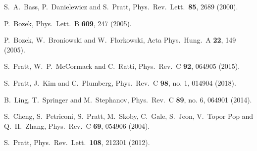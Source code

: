 \begin{thebibliography}{99}
  S.~A.~Bass, P.~Danielewicz and S.~Pratt,
  Phys.\ Rev.\ Lett.\  {\bf 85}, 2689 (2000).
	

  P.~Bozek,
  Phys.\ Lett.\ B {\bf 609}, 247 (2005).

  P.~Bozek, W.~Broniowski and W.~Florkowski,
  Acta Phys.\ Hung.\ A {\bf 22}, 149 (2005).
 
  S.~Pratt, W.~P.~McCormack and C.~Ratti,
  Phys.\ Rev.\ C {\bf 92}, 064905 (2015).

  S.~Pratt, J.~Kim and C.~Plumberg,
  Phys.\ Rev.\ C {\bf 98}, no. 1, 014904 (2018).

  B.~Ling, T.~Springer and M.~Stephanov,
  Phys.\ Rev.\ C {\bf 89}, no. 6, 064901 (2014).


  S.~Cheng, S.~Petriconi, S.~Pratt, M.~Skoby, C.~Gale, S.~Jeon, V.~Topor Pop and Q.~H.~Zhang,
  Phys.\ Rev.\ C {\bf 69}, 054906 (2004).

  S.~Pratt,
  Phys.\ Rev.\ Lett.\  {\bf 108}, 212301 (2012).


\end{thebibliography}
